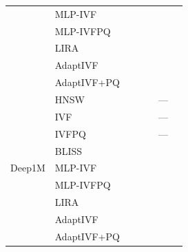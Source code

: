 \begin{table}[t]
\begin{tabular}{llrrrrr}
 & MLP-IVF       & \placeholder{\_\_\_} & \placeholder{\_\_\_} & \placeholder{\_\_\_} & \placeholder{\_\_\_} & \placeholder{\_\_\_} \\
 & MLP-IVFPQ     & \placeholder{\_\_\_} & \placeholder{\_\_\_} & \placeholder{\_\_\_} & \placeholder{\_\_\_} & \placeholder{\_\_\_} \\
 & LIRA          & \placeholder{\_\_\_} & \placeholder{\_\_\_} & \placeholder{\_\_\_} & \placeholder{\_\_\_} & \placeholder{\_\_\_} \\
 & AdaptIVF      & \placeholder{\_\_\_} & \placeholder{\_\_\_} & \placeholder{\_\_\_} & \placeholder{\_\_\_} & \placeholder{\_\_\_} \\
 & AdaptIVF+PQ   & \placeholder{\_\_\_} & \placeholder{\_\_\_} & \placeholder{\_\_\_} & \placeholder{\_\_\_} & \placeholder{\_\_\_} \\
\midrule
\multirow{9}{*}{Deep1M}
 & HNSW          & \placeholder{\_\_\_} & \placeholder{\_\_\_} & \placeholder{\_\_\_} & ---                  & \placeholder{\_\_\_} \\
 & IVF           & \placeholder{\_\_\_} & \placeholder{\_\_\_} & \placeholder{\_\_\_} & ---                  & \placeholder{\_\_\_} \\
 & IVFPQ         & \placeholder{\_\_\_} & \placeholder{\_\_\_} & \placeholder{\_\_\_} & ---                  & \placeholder{\_\_\_} \\
 & BLISS         & \placeholder{\_\_\_} & \placeholder{\_\_\_} & \placeholder{\_\_\_} & \placeholder{\_\_\_} & \placeholder{\_\_\_} \\
 & MLP-IVF       & \placeholder{\_\_\_} & \placeholder{\_\_\_} & \placeholder{\_\_\_} & \placeholder{\_\_\_} & \placeholder{\_\_\_} \\
 & MLP-IVFPQ     & \placeholder{\_\_\_} & \placeholder{\_\_\_} & \placeholder{\_\_\_} & \placeholder{\_\_\_} & \placeholder{\_\_\_} \\
 & LIRA          & \placeholder{\_\_\_} & \placeholder{\_\_\_} & \placeholder{\_\_\_} & \placeholder{\_\_\_} & \placeholder{\_\_\_} \\
 & AdaptIVF      & \placeholder{\_\_\_} & \placeholder{\_\_\_} & \placeholder{\_\_\_} & \placeholder{\_\_\_} & \placeholder{\_\_\_} \\
 & AdaptIVF+PQ   & \placeholder{\_\_\_} & \placeholder{\_\_\_} & \placeholder{\_\_\_} & \placeholder{\_\_\_} & \placeholder{\_\_\_} \\
\bottomrule
\end{tabular}
\end{table}


